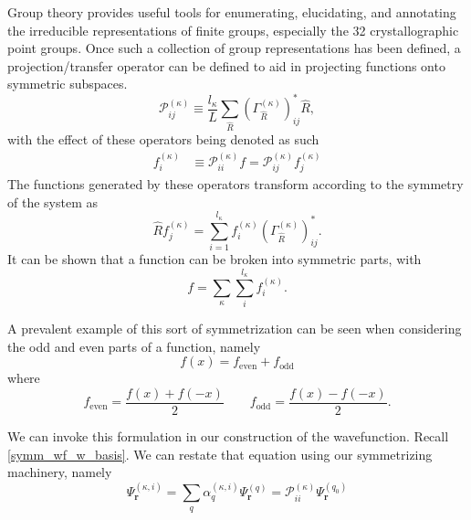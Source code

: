 Group theory provides useful tools for enumerating, elucidating, and annotating
the irreducible representations of finite groups, especially the 32
crystallographic point groups. Once such a collection of group representations
has been defined, a projection/transfer operator can be defined to aid in
projecting functions onto symmetric subspaces.
\begin{equation}
  \mathcal{P}_{ij}^{\left(\kappa\right)}
  \equiv
  \frac{l_{\kappa}}{L}
  \sum_{\hat{R}}
  \left(\Gamma_{\hat{R}}^{\left(\kappa\right)}\right)_{ij}^{*}
  \hat{R},
\end{equation}
with the effect of these operators being denoted as such
\begin{align*}
  f_{i}^{\left(\kappa\right)}
  & \equiv
  \mathcal{P}_{ii}^{\left(\kappa\right)}f
  =
  \mathcal{P}_{ij}^{\left(\kappa\right)}f_{j}^{\left(\kappa\right)}
\end{align*}
The functions generated by these operators transform according to the symmetry
of the system as
\begin{equation*}
  \hat{R}f_{j}^{\left(\kappa\right)}
  =
  \sum_{i=1}^{l_{\kappa}}
  f_{i}^{\left(\kappa\right)}
  \left(\Gamma_{\hat{R}}^{\left(\kappa\right)}\right)_{ij}^{*}.
\end{equation*}
It can be shown that a function can be broken into symmetric parts, with
\begin{equation*}
  f
  =
  \sum_{\kappa}
  \sum_{i}^{l_{\kappa}}
  f_{i}^{\left(\kappa\right)}.
\end{equation*}

A prevalent example of this sort of symmetrization can be seen when considering
the odd and even parts of a function, namely
\begin{equation*}
  f\left(x\right) = f_{\text{even}} + f_{\text{odd}}
\end{equation*}
where
\begin{equation*}
  f_{\text{even}} = \frac{f\left(x\right) + f\left(-x\right)}{2}
  \quad\quad
  f_{\text{odd}}  = \frac{f\left(x\right) - f\left(-x\right)}{2}.
\end{equation*}

We can invoke this formulation in our construction of the wavefunction. Recall
\ref{symm_wf_w_basis}. We can restate that equation using our symmetrizing
machinery, namely
\begin{equation*}
  \Psi_{\bm{r}}^{\left(\kappa,i\right)}
  =
  \sum_{q} \alpha_{q}^{\left(\kappa,i\right)} \Psi_{\bm{r}}^{\left(q\right)}
  =
  \mathcal{P}_{ii}^{\left(\kappa\right)} \Psi_{\bm{r}}^{\left(q_{0}\right)}
\end{equation*}

